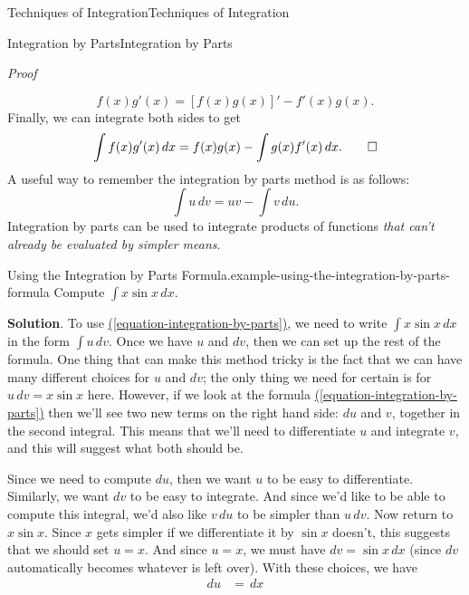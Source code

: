 \documentclass[10pt,]{book}
\makeatletter
\renewcommand*{\proofname}{Proof}
\renewenvironment{proof}[1][\proofname]{\par
  \pushQED{\qed}%
  \normalfont \topsep6\p@\@plus6\p@\relax
  \trivlist
  \item\relax
    {\itshape
    #1\@addpunct{.}}\hspace\labelsep\ignorespaces
}{%
  \popQED\endtrivlist\@endpefalse
}
\numberwithin{equation}{section}
\makeatother
\begin{document}
\begin{chapterptx}{Techniques of Integration}{}{Techniques of Integration}{}{}
\begin{sectionptx}{Integration by Parts}{}{Integration by Parts}{}{}
\begin{proof}
\begin{equation*}
f(x)g'(x) = [f(x)g(x)]' - f'(x)g(x).
\end{equation*}
Finally, we can integrate both sides to get%
\begin{equation*}
\int f(x)g'(x)\,dx = f(x)g(x) - \int g(x)f'(x)\,dx.\qedhere
\end{equation*}
%
\end{proof}
\hypertarget{p-499}{}%
A useful way to remember the integration by parts method is as follows:%
\begin{equation}
\int u\,dv = uv - \int v\,du.\label{equation-integration-by-parts}
\end{equation}
Integration by parts can be used to integrate products of functions \emph{that can't already be evaluated by simpler means}.%
\begin{example}{Using the Integration by Parts Formula.}{example-using-the-integration-by-parts-formula}%
\hypertarget{p-500}{}%
Compute \(\int x\sin x\,dx\).%
\par\smallskip%
\noindent\textbf{Solution}.\hypertarget{solution-110}{}\quad%
\hypertarget{p-501}{}%
To use \hyperref[equation-integration-by-parts]{(\ref{equation-integration-by-parts})}, we need to write \(\int x\sin x\,dx\) in the form \(\int u\,dv\). Once we have \(u\) and \(dv\), then we can set up the rest of the formula. One thing that can make this method tricky is the fact that we can have many different choices for \(u\) and \(dv\); the only thing we need for certain is for \(u\,dv = x\sin x\) here. However, if we look at the formula \hyperref[equation-integration-by-parts]{(\ref{equation-integration-by-parts})} then we'll see two new terms on the right hand side: \(du\) and \(v\), together in the second integral. This means that we'll need to differentiate \(u\) and integrate \(v\), and this will suggest what both should be.%
\par
\hypertarget{p-502}{}%
Since we need to compute \(du\), then we want \(u\) to be easy to differentiate. Similarly, we want \(dv\) to be easy to integrate. And since we'd like to be able to compute this integral, we'd also like \(v\,du\) to be simpler than \(u\,dv\). Now return to \(x\sin x\). Since \(x\) gets simpler if we differentiate it by \(\sin x\) doesn't, this suggests that we should set \(u = x\). And since \(u = x\), we must have \(dv = \sin x\,dx\) (since \(dv\) automatically becomes whatever is left over). With these choices, we have%
%
\begin{align*}
du & = \,dx \\

\end{align*}
\end{example}
\end{sectionptx}
\end{chapterptx}
\end{document}
